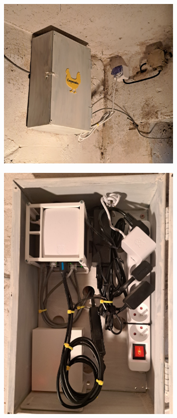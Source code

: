 \begin{figure}[H]
    \centering
    \includegraphics[width=0.8\textwidth]{img/instalace_rozvadec_krabice}
    \label{fig:instalace_rozvadec_krabice}
\end{figure}
\begin{figure}[H]
    \centering
    \includegraphics[width=0.8\textwidth]{img/instalace_rozvadec_vyzbroj}
    \label{fig:instalace_rozvadec_vyzbroj}
\end{figure}

